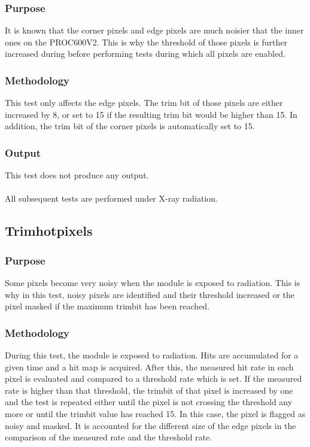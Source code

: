 \documentclass[a4paper,12pt,twoside]{article}
\begin{document}
\subsubsection{Purpose}
It is known that the corner pixels and edge pixels are much noisier that the inner ones on the PROC600V2. This is why the threshold of those pixels is further increased during before performing tests during which all pixels are enabled.
\subsubsection{Methodology}
This test only affects the edge pixels. The trim bit of those pixels are either increased by 8, or set to 15 if the resulting trim bit would be higher than 15. In addition, the trim bit of the corner pixels is automatically set to 15.
\subsubsection{Output}
This test does not produce any output.
\\
\\
All subsequent tests are performed under X-ray radiation.
\subsection{Trimhotpixels}
\subsubsection{Purpose}
Some pixels become very noisy when the module is exposed to radiation. This is why in this test, noisy pixels are identified and their threshold increased or the pixel masked if the maximum trimbit has been reached.
\subsubsection{Methodology}
During this test, the module is exposed to radiation. Hits are accumulated for a given time and a hit map is acquired. After this, the measured hit rate in each pixel is evaluated and compared to a threshold rate which is set. If the measured rate is higher than that threshold, the trimbit of that pixel is increased by one and the test is repeated either until the pixel is not crossing the threshold any more or until the trimbit value has reached 15. In this case, the pixel is flagged as noisy and masked. 
It is accounted for the different size of the edge pixels in the comparison of the measured rate and the threshold rate.
\end{document}
